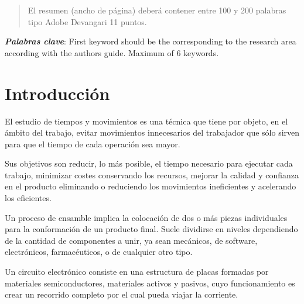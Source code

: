     
    
    \begin{abstract}
    \noindent 
    El resumen (ancho de página) deberá contener entre 100 y 200 palabras tipo Adobe Devangari 11 puntos.
    
    \end{abstract}
    \textbf{\textit{Palabras clave}}: {First keyword should be the corresponding to the research area according with the authors guide. Maximum of 6 keywords.}
    
    \section{Introducción}
    
    El estudio de tiempos y movimientos es una técnica que tiene por objeto, en el ámbito del trabajo, evitar movimientos innecesarios del trabajador que sólo sirven para que el tiempo de cada operación sea mayor.
    
    Sus objetivos son reducir, lo más posible, el tiempo necesario para ejecutar cada trabajo, minimizar costes conservando los recursos, mejorar la calidad y confianza en el producto eliminando o reduciendo los movimientos ineficientes y acelerando los eficientes.
    
    
    Un proceso de ensamble implica la colocación de dos o más piezas individuales para la conformación de un producto final. Suele dividirse en niveles dependiendo de la cantidad de componentes a unir, ya sean mecánicos, de software, electrónicos, farmacéuticos, o de cualquier otro tipo.
    
    Un circuito electrónico consiste en una estructura de placas formadas por materiales semiconductores, materiales activos y pasivos, cuyo funcionamiento es crear un recorrido completo por el cual pueda viajar la corriente.
    

